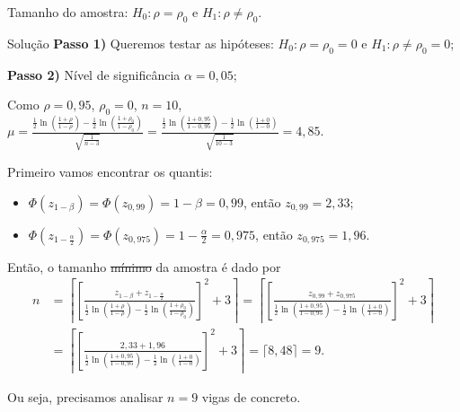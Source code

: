 \documentclass[9pt]{beamer}
\begin{document}
\begin{frame}{Tamanho do amostra: $H_0:\rho = \rho_0$ e $H_1: \rho \neq \rho_0$.}

\footnotesize
\begin{block}{Solução}
	\textbf{Passo 1)} Queremos testar as hipóteses: $H_0: \rho = \rho_0=0$ e $H_1: \rho \neq \rho_0 =0$;
	
	\textbf{Passo 2)} Nível de significância $\alpha=0,05$;
	
	Como $\rho = 0,95$, $\rho_0 = 0$, $n  =10$, $\mu = \frac{\frac{1}{2}\ln \left(\frac{1 + \rho}{1 - \rho}\right) - \frac{1}{2}\ln \left(\frac{1 + \rho_0}{1 - \rho_0}\right)}{\sqrt{\frac{1}{n-3}}} =\allowbreak \frac{\frac{1}{2}\ln \left(\frac{1 + 0,95}{1 - 0,95}\right) - \frac{1}{2}\ln \left(\frac{1 + 0}{1 - 0}\right)}{\sqrt{\frac{1}{10-3}}} = 4,85$. 
	
	Primeiro vamos encontrar os quantis:
	\begin{itemize}
		\item $\Phi\left( z_{1-\beta} \right) = \Phi\left( z_{0,99} \right) = 1-\beta = 0,99$, então $z_{0,99} = 2,33$;
		\item $\Phi\left( z_{1-\frac{\alpha}{2}} \right) = \Phi\left( z_{0,975} \right) = 1-\frac{\alpha}{2} = 0,975$, então $z_{0,975} = 1,96$.
	\end{itemize}
	
	Então, o tamanho \sout{mínimo} da amostra é dado por
	\begin{align*}
	n &= \left\lceil \left[ \frac{z_{1-\beta} + z_{1-\frac{\alpha}{2}}}{\frac{1}{2} \ln \left( \frac{1 + \rho}{1 - \rho} \right) - \frac{1}{2} \ln \left( \frac{1 + \rho_0}{1 - \rho_0} \right)} \right]^2  + 3\right\rceil = \left\lceil \left[ \frac{z_{0,99} + z_{0,975}}{\frac{1}{2} \ln \left( \frac{1 + 0,95}{1 - 0,95} \right) - \frac{1}{2} \ln \left( \frac{1 + 0}{1 - 0} \right)} \right]^2  + 3\right\rceil\\
	&= \left\lceil \left[ \frac{2,33 + 1,96}{\frac{1}{2} \ln \left( \frac{1 + 0,95}{1 - 0,95} \right) - \frac{1}{2} \ln \left( \frac{1 + 0}{1 - 0} \right)} \right]^2  + 3\right\rceil = \lceil 8,48 \rceil = 9.
	\end{align*}
	
	Ou seja, precisamos analisar $n=9$ vigas de concreto.
\end{block}
\normalsize

\end{frame}
\end{document}
